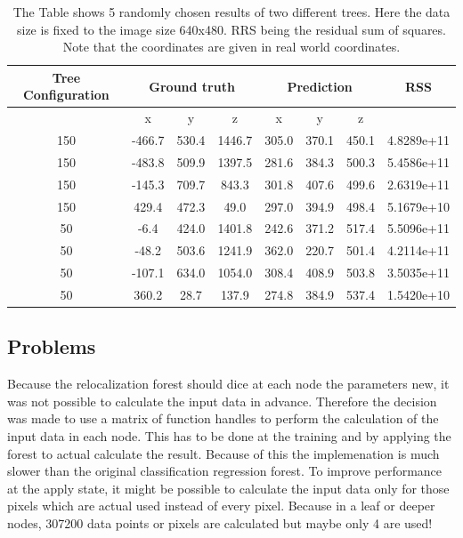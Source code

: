 \begin{table}[p]
\begin{tabular}{|c|c|c|c|c|c|c|c|}
\toprule
\hline Tree Configuration & \multicolumn{3}{|c|}{Ground truth} & \multicolumn{3}{|c|}{Prediction} & RSS \\ \hline
& x & y & z & x & y & z & \\ \hline
\midrule
\hline
150 & -466.7 & 530.4 & 1446.7 & 305.0 & 370.1 & 450.1 & 4.8289e+11  \\ \hline
150 & -483.8 & 509.9 & 1397.5 & 281.6 & 384.3 & 500.3 & 5.4586e+11  \\ \hline
150 & -145.3 & 709.7 & 843.3 & 301.8 & 407.6 & 499.6 & 2.6319e+11  \\ \hline
150 & 429.4 & 472.3 & 49.0 & 297.0 & 394.9 & 498.4 & 5.1679e+10  \\ \hline
50 & -6.4 & 424.0 & 1401.8 & 242.6 & 371.2 & 517.4 & 5.5096e+11  \\ \hline
50 & -48.2 & 503.6 & 1241.9 & 362.0 &  220.7 & 501.4 & 4.2114e+11 \\ \hline
50 & -107.1 & 634.0 & 1054.0 & 308.4 & 408.9 & 503.8 & 3.5035e+11 \\ \hline
50 & 360.2 & 28.7 & 137.9 &  274.8 & 384.9 & 537.4 & 1.5420e+10 \\ \hline
\bottomrule
\end{tabular}
\caption{The Table shows 5 randomly chosen results of two different trees. Here the data size is fixed to the image size 640x480. RRS being the residual sum of squares. Note that the coordinates are given in real world coordinates.}
\label{tab:res_reallocation}
\end{table}

\subsection{Problems}

Because the relocalization forest should dice at each node the parameters new, it was not possible to calculate the input data in advance. Therefore the decision was made to use a matrix of function handles to perform the calculation of the input data in each node. This has to be done at the training and by applying the forest to actual calculate the result. Because of this the implemenation is much slower than the original classification regression forest. To improve performance at the apply state, it might be possible to calculate the input data only for those pixels which are actual used instead of every pixel. Because in a leaf or deeper nodes, 307200 data points or pixels are calculated but maybe only 4 are used!

